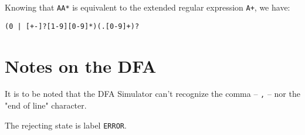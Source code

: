 \documentclass[a4paper,11pt]{article}
\begin{document}
Knowing that \verb|AA*| is equivalent to the extended regular expression \texttt{A+}, we have:
\begin{center}
	\texttt{(0 | [+-]?[1-9][0-9]*)(.[0-9]+)?}
\end{center}


\section{Notes on the DFA}
It is to be noted that the DFA Simulator can't recognize the comma -- \texttt{,} --
nor the "end of line" character.

The rejecting state is label \texttt{ERROR}.
\end{document}
